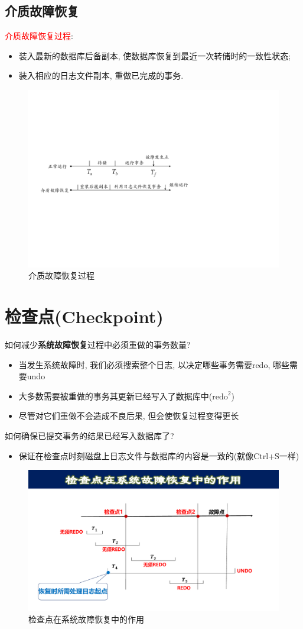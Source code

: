 \subsection{介质故障恢复}

\textcolor{red}{介质故障恢复过程}:
\begin{itemize}
    \item 装入最新的数据库后备副本, 使数据库恢复到最近一次转储时的一致性状态;
    \item 装入相应的日志文件副本, 重做已完成的事务.
\end{itemize}

\begin{figure}[H]
    \centering
    \includegraphics[width=.6\textwidth]{figure/介质故障.pdf}
    \caption{介质故障恢复过程}
\end{figure}

\section{检查点(Checkpoint)}

如何减少\textbf{系统故障恢复}过程中必须重做的事务数量?
\begin{itemize}
    \item 当发生系统故障时, 我们必须搜索整个日志, 以决定哪些事务需要redo, 哪些需要undo
    \item 大多数需要被重做的事务其更新已经写入了数据库中($\text{redo}^2$)
    \item 尽管对它们重做不会造成不良后果, 但会使恢复过程变得更长
\end{itemize}

如何确保已提交事务的结果已经写入数据库了?
\begin{itemize}
    \item 保证在检查点时刻磁盘上日志文件与数据库的内容是一致的(就像Ctrl+S一样)
\end{itemize}

\begin{figure}[H]
    \centering
    \includegraphics[width=.7\textwidth]{figure/检查点.pdf}
    \caption{检查点在系统故障恢复中的作用}
\end{figure}


